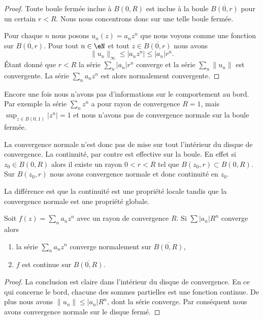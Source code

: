 \begin{proof}
    Toute boule fermée inclue à \( B(0,R)\) est inclue à la boule \( \overline{ B(0,r) }\) pour un certain \( r<R\). Nous nous concentrons donc sur une telle boule fermée.

    Pour chaque \( n\) nous posons \( u_n(z)=a_nz^n\) que nous voyons comme une fonction sur \( \overline{ B(0,r) }\). Pour tout \( n\in \eN\) et tout \( z\in\overline{ B(0,r) }\) nous avons
    \begin{equation}
        \| u_n \|_{\infty}\leq| a_nz^n |\leq | a_n |r^n.
    \end{equation}
    Étant donné que \( r<R\) la série \( \sum_n | a_n |r^n\) converge et la série \( \sum_n\| u_n \|\) est convergente. La série \( \sum_na_nz^n\) est alors normalement convergente.
\end{proof}

\begin{example}
    Encore une fois nous n'avons pas d'informations sur le comportement au bord. Par exemple la série \( \sum_nz^n\) a pour rayon de convergence \( R=1\), mais \( \sup_{z\in B(0,1)}| z^n |=1\) et nous n'avons pas de convergence normale sur la boule fermée.
\end{example}

La convergence normale n'est donc pas de mise sur tout l'intérieur du disque de convergence. La continuité, par contre est effective sur la boule. En effet si \( z_0\in B(0,R)\) alors il existe un rayon \( 0<r<R\) tel que \( B(z_0,r)\subset B(0,R)\). Sur \( B(z_0,r)\) nous avons convergence normale et donc continuité en \( z_0\).

La différence est que la continuité est une propriété locale tandis que la convergence normale est une propriété globale.

\begin{proposition}
    Soit \( f(z)=\sum_na_nz^n\) avec un rayon de convergence \( R\). Si \( \sum | a_n |R^n\) converge alors
    \begin{enumerate}
        \item
            la série \( \sum_na_nz^n\) converge normalement sur \( \overline{ B(0,R) }\),
        \item
            \( f\) est continue sur \( \overline{ B(0,R) }\).
    \end{enumerate}
\end{proposition}

\begin{proof}
    La conclusion est claire dans l'intérieur du disque de convergence. En ce qui concerne le bord, chacune des sommes partielles est une fonction continue. De plus nous avons \( \| u_n \|\leq | a_n |R^n\), dont la série converge. Par conséquent nous avons convergence normale sur le disque fermé.
\end{proof}


